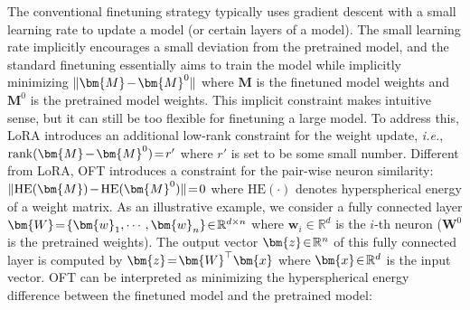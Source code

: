 The conventional finetuning strategy typically uses gradient descent with a small learning rate to update a model (or certain layers of a model). The small learning rate implicitly encourages a small deviation from the pretrained model, and the standard finetuning essentially aims to train the model while implicitly minimizing $\thickmuskip=2mu \medmuskip=2mu \| \bm{M} - \bm{M}^0\|$ where $\bm{M}$ is the finetuned model weights and $\bm{M}^0$ is the pretrained model weights. This implicit constraint makes intuitive sense, but it can still be too flexible for finetuning a large model. To address this, LoRA introduces an additional low-rank constraint for the weight update, \emph{i.e.}, $\thickmuskip=2mu \medmuskip=2mu \text{rank}(\bm{M} - \bm{M}^0)=r'$ where $r'$ is set to be some small number. Different from LoRA, OFT introduces a constraint for the pair-wise neuron similarity: $\thickmuskip=2mu \medmuskip=2mu \| \text{HE}(\bm{M})-\text{HE}(\bm{M}^0) \|=0$ where $\text{HE}(\cdot)$ denotes hyperspherical energy of a weight matrix. As an illustrative example, we consider a fully connected layer $\thickmuskip=2mu \medmuskip=2mu \bm{W}=\{\bm{w}_1,\cdots,\bm{w}_n\}\in\mathbb{R}^{d\times n}$ where $\bm{w}_i\in\mathbb{R}^{d}$ is the $i$-th neuron ($\bm{W}^0$ is the pretrained weights). The output vector $\thickmuskip=2mu \medmuskip=2mu \bm{z}\in\mathbb{R}^n$ of this fully connected layer is computed by $\thickmuskip=2mu \medmuskip=2mu \bm{z}=\bm{W}^\top\bm{x}$ where $\thickmuskip=2mu \medmuskip=2mu \bm{x}\in\mathbb{R}^d$ is the input vector. OFT can be interpreted as minimizing the hyperspherical energy difference between the finetuned model and the pretrained model:

